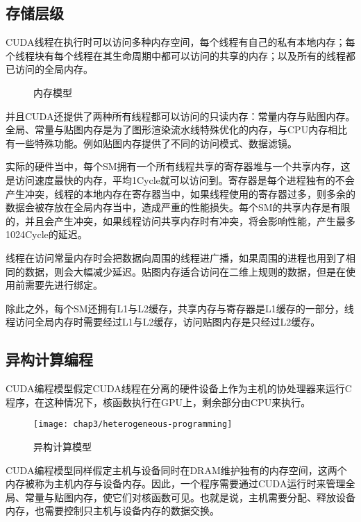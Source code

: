     \subsection{存储层级}
      CUDA线程在执行时可以访问多种内存空间，每个线程有自己的私有本地内存；每个线程块有每个线程在其生命周期中都可以访问的共享的内存；以及所有的线程都已访问的全局内存。
      \par
      \begin{figure}[htp]
        \centering
        \hspace{1cm}
        \caption{内存模型}
      \end{figure}
      并且CUDA还提供了两种所有线程都可以访问的只读内存：常量内存与贴图内存。全局、常量与贴图内存是为了图形渲染流水线特殊优化的内存，与CPU内存相比有一些特殊功能。例如贴图内存提供了不同的访问模式、数据滤镜。
      \par
      实际的硬件当中，每个SM拥有一个所有线程共享的寄存器堆与一个共享内存，这是访问速度最快的内存，平均1Cycle就可以访问到。寄存器是每个进程独有的不会产生冲突，线程的本地内存在寄存器当中，如果线程使用的寄存器过多，则多余的数据会被存放在全局内存当中，造成严重的性能损失。每个SM的共享内存是有限的，并且会产生冲突，如果线程访问共享内存时有冲突，将会影响性能，产生最多1024Cycle的延迟。
      \par
      线程在访问常量内存时会把数据向周围的线程进广播，如果周围的进程也用到了相同的数据，则会大幅减少延迟。贴图内存适合访问在二维上规则的数据，但是在使用前需要先进行绑定。
      \par
      除此之外，每个SM还拥有L1与L2缓存，共享内存与寄存器是L1缓存的一部分，线程访问全局内存时需要经过L1与L2缓存，访问贴图内存是只经过L2缓存\cite{kirk2007nvidia}。
    \subsection{异构计算编程}
      CUDA编程模型假定CUDA线程在分离的硬件设备上作为主机的协处理器来运行C程序，在这种情况下，核函数执行在GPU上，剩余部分由CPU来执行。
      \begin{figure}[htp]
        \centering
        \texttt{[image: chap3/heterogeneous-programming]}
        \caption{异构计算模型}
      \end{figure}
      \par
      CUDA编程模型同样假定主机与设备同时在DRAM维护独有的内存空间，这两个内存被称为主机内存与设备内存。因此，一个程序需要通过CUDA运行时来管理全局、常量与贴图内存，使它们对核函数可见。也就是说，主机需要分配、释放设备内存，也需要控制只主机与设备内存的数据交换。
